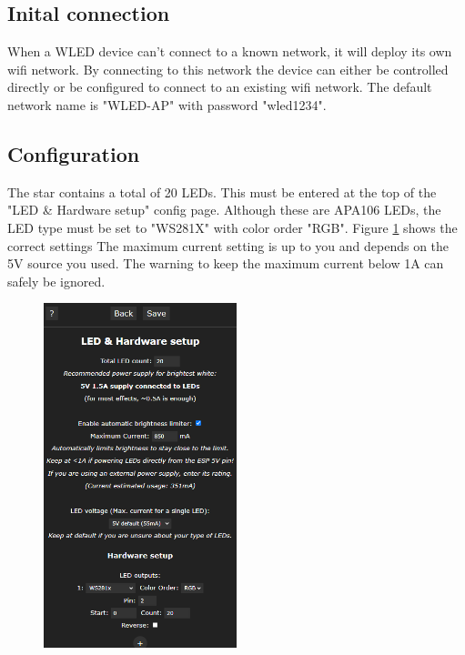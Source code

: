 \documentclass[12pt]{article}
\begin{document}
\subsection{Inital connection}
When a WLED device can't connect to a known network, it will deploy its own wifi network. By connecting to this network the device can either be controlled directly or be configured to connect to an existing wifi network.
The default network name is "WLED-AP" with password "wled1234".


\subsection{Configuration}
The star contains a total of 20 LEDs. This must be entered at the top of the "LED \& Hardware setup" config page. Although these are APA106 LEDs, the LED type must be set to "WS281X" with color order "RGB".
Figure \ref{fig:wledConfig} shows the correct settings The maximum current setting is up to you and depends on the 5V source you used. The warning to keep the maximum current below 1A can safely be ignored.

\begin{figure}[H]
	\centering
	\includegraphics[width=0.5\textwidth]{../images/manual/wled_config.png}
	\caption{}
	\label{fig:wledConfig}
\end{figure}

\clearpage
\appendix

\end{document}
